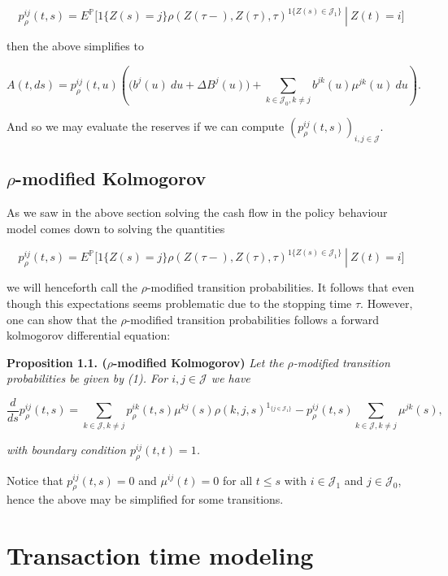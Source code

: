 \documentclass[a4paper,10pt,openany]{book}
\begin{document}
\[
p_\rho^{ij}(t,s)=E^\mathbb P\Big[\left.1\{Z(s)=j\}\rho(Z(\tau-),Z(\tau),\tau)^{1\{Z(s)\in \mathcal J_1\}}\ \right\vert\ Z(t)=i\Big]
\]

then the above simplifies to

\[
A(t,ds)=p_\rho^{ij}(t,u)\left(\Big(b^{j}(u)\ du+ \Delta B^j(u)\Big)+\sum_{k\in \mathcal J_0, k\ne j}b^{jk}(u)\mu^{jk}(u)\ du \right).
\]

And so we may evaluate the reserves if we can compute \((p_\rho^{ij}(t,s))_{i,j\in\mathcal J}\).

\hypertarget{rho-modified-kolmogorov}{%
\subsection{\texorpdfstring{\(\rho\)-modified Kolmogorov}{\textbackslash rho-modified Kolmogorov}}\label{rho-modified-kolmogorov}}

As we saw in the above section solving the cash flow in the policy behaviour model comes down to solving the quantities

\[
p_\rho^{ij}(t,s)=E^\mathbb P\Big[\left.1\{Z(s)=j\}\rho(Z(\tau-),Z(\tau),\tau)^{1\{Z(s)\in \mathcal J_1\}}\ \right\vert\ Z(t)=i\Big]\tag{1}
\]

we will henceforth call the \(\rho\)-modified transition probabilities. It follows that even though this expectations seems problematic due to the stopping time \(\tau\). However, one can show that the \(\rho\)-modified transition probabilities follows a forward kolmogorov differential equation:

\textbf{Proposition 1.1. (\(\rho\)-modified Kolmogorov)} \emph{Let the \(\rho\)-modified transition probabilities be given by (1). For \(i,j\in\mathcal J\) we have}

\[
\frac{d}{ds}p_\rho^{ij}(t,s)=\sum_{k\in\mathcal J,k\ne j}p_\rho^{ik}(t,s)\mu^{kj}(s)\rho(k,j,s)^{1_{\{j\in \mathcal J_1\}}}-p_\rho^{ij}(t,s)\sum_{k\in \mathcal J,k\ne j}\mu^{jk}(s),
\]

\emph{with boundary condition \(p_\rho^{ij}(t,t)=1\).}

Notice that \(p_\rho^{ij}(t,s)=0\) and \(\mu^{ij}(t)=0\) for all \(t\le s\) with \(i\in\mathcal J_1\) and \(j\in\mathcal J_0\), hence the above may be simplified for some transitions.

\hypertarget{transaction-time-modeling}{%
\section{Transaction time modeling}\label{transaction-time-modeling}}
\end{document}
